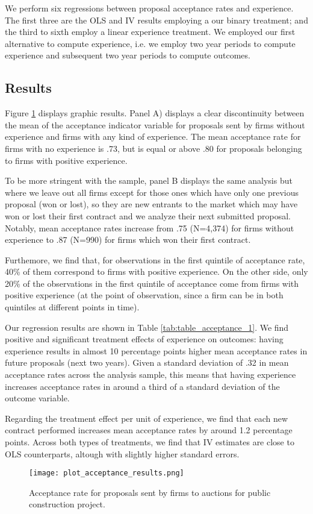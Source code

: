 We perform six regressions between proposal acceptance rates and experience. The first three are the OLS and IV results employing a our binary treatment; and the third to sixth employ a linear experience treatment. We employed our first alternative to compute experience, i.e. we employ two year periods to compute experience and subsequent two year periods to compute outcomes.

\subsection{Results}
Figure \ref{fig:plot_acceptance_results} displays graphic results. Panel A) displays a clear discontinuity between the mean of the acceptance indicator variable for proposals sent by firms without experience and firms with any kind of experience. The mean acceptance rate for firms with no experience is .73, but is equal or above .80 for proposals belonging to firms with positive experience.

 To be more stringent with the sample, panel B displays the same analysis but where we leave out all firms except for those ones which have only one previous proposal (won or lost), so they are new entrants to the market which may have won or lost their first contract and we analyze their next submitted proposal.  Notably, mean acceptance rates increase from .75 (N=4,374) for firms without experience to .87 (N=990) for firms which won their first contract.

Furthemore, we find that, for observations in the first quintile of acceptance rate, 40\% of them correspond to firms with positive experience. On the other side, only 20\% of the observations in the first quintile of acceptance come from firms with positive experience (at the point of observation, since a firm can be in both quintiles at different points in time).

Our regression results are shown in Table \ref{tab:table_acceptance_1}. We find positive and significant treatment effects of experience on outcomes: having experience results in almost 10 percentage points higher mean acceptance rates in  future proposals (next two years). Given a standard deviation of .32 in mean acceptance rates across the analysis sample, this means that having experience increases acceptance rates in around a third of a standard deviation of the outcome variable.

Regarding the treatment effect per unit of experience, we find that each new contract performed increases mean acceptance rates by around 1.2 percentage points. Across both types of treatments, we find that IV estimates are close to OLS counterparts, altough with slightly higher standard errors.

\begin{figure}
\centering
  \texttt{[image: plot\_acceptance\_results.png]}
  \caption{Acceptance rate for proposals sent by firms to auctions for public construction project.}
  \label{fig:plot_acceptance_results}
\end{figure}



\clearpage

